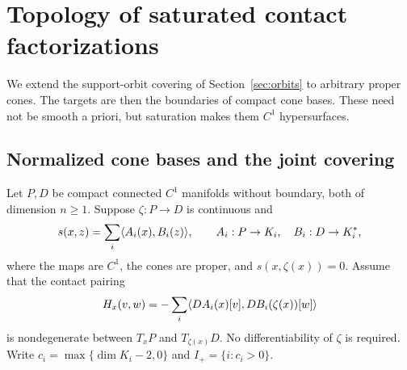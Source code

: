 \section{Topology of saturated contact factorizations}
\label{sec:general-topology}
We extend the support-orbit covering of Section~\ref{sec:orbits} to
arbitrary proper cones. The targets are then the boundaries of compact
cone bases. These need not be smooth a priori, but saturation makes them
$C^1$ hypersurfaces.

\subsection{Normalized cone bases and the joint covering}
Let $P,D$ be compact connected $C^1$ manifolds without boundary, both of
dimension $n\geq1$. Suppose $\zeta:P\to D$ is continuous and
\[
 s(x,z)=\sum_i\langle A_i(x),B_i(z)\rangle,\qquad
 A_i:P\to K_i,\quad B_i:D\to K_i^*,
\]
where the maps are $C^1$, the cones are proper, and
$s(x,\zeta(x))=0$. Assume that the contact pairing
\begin{equation}\label{eq:abstract-contact-pairing}
 H_x(v,w)=-\sum_i\langle DA_i(x)[v],DB_i(\zeta(x))[w]\rangle
\end{equation}
is nondegenerate between $T_xP$ and $T_{\zeta(x)}D$.
No differentiability of $\zeta$ is required. Write
$c_i=\max\{\dim K_i-2,0\}$ and $I_+=\{i:c_i>0\}$.

